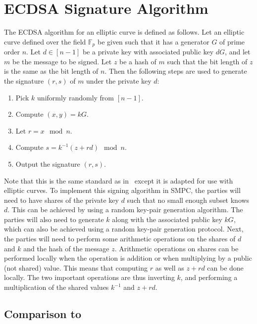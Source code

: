 \documentclass{article}
\newcommand{\seq}[1]{\left[#1\right]}
\theoremstyle{remark}
\begin{document}
\section{ECDSA Signature Algorithm}

The ECDSA algorithm for an elliptic curve is defined as follows. Let an
elliptic curve defined over the field $\mathbb{F}_p$ be given such that it has
a generator $G$ of prime order $n$. Let $d \in \seq{n-1}$ be a private key with
associated public key $dG$, and let $m$ be the message to be signed. Let $z$ be
a hash of $m$ such that the bit length of $z$ is the same as the bit length of
$n$. Then the following steps are used to generate the signature $(r, s)$ of
$m$ under the private key $d$:

\begin{enumerate}
	\item Pick $k$ uniformly randomly from $\seq{n-1}$.
	\item Compute $(x, y) = kG$.
	\item Let $r = x \mod n$.
	\item Compute $s = k^{-1}(z + rd) \mod n$.
	\item Output the signature $(r, s)$.
\end{enumerate}

Note that this is the same standard as in~\cite{gjkr96} except it is adapted
for use with elliptic curves. To implement this signing algorithm in SMPC, the
parties will need to have shares of the private key $d$ such that no small
enough subset knows $d$. This can be achieved by using a random key-pair
generation algorithm. The parties will also need to generate $k$ along with the
associated public key $kG$, which can also be achieved using a random key-pair
generation protocol. Next, the parties will need to perform some arithmetic
operations on the shares of $d$ and $k$ and the hash of the message $z$.
Arithmetic operations on shares can be performed locally when the operation is
addition or when multiplying by a public (not shared) value. This means that
computing $r$ as well as $z + rd$ can be done locally. The two important
operations are thus inverting $k$, and performing a multiplication of the
shared values $k^{-1}$ and $z + rd$.

\subsection{Comparison to~\cite{gjkr96}}
\end{document}
